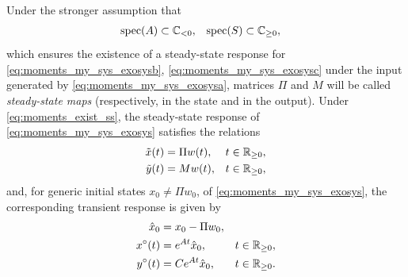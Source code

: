 Under the stronger assumption that
\begin{align}
  \label{eq:moments_exist_ss}
	\operatorname{spec}(A)&\subset\mathbb{C}_{<0}, & \operatorname{spec}(S)&\subset\mathbb{C}_{\geq0},
\end{align}
which ensures the existence of a steady-state response for
\eqref{eq:moments_my_sys_exosysb}, \eqref{eq:moments_my_sys_exosysc}
under the input generated by \eqref{eq:moments_my_sys_exosysa},
matrices $\Pi$ and $M$ will be called \emph{steady-state maps}
(respectively, in the state and in the output).
Under \eqref{eq:moments_exist_ss}, the steady-state response of
\eqref{eq:moments_my_sys_exosys} satisfies the relations
\begin{subequations}
  \label{eq:moments_moment_ss}
	\begin{align}
		\tilde{x}(t) &= \Pi w(t), & t\in\mathbb{R}_{\geq 0}, \label{eq:moments_moment_ssa} \\
		\tilde{y}(t) &= Mw(t), & t\in\mathbb{R}_{\geq 0}, \label{eq:moments_moment_ssb}
	\end{align}
\end{subequations}
and, for generic initial states $x_0 \neq \Pi w_0$, of \eqref{eq:moments_my_sys_exosys},
the corresponding transient response is given by
\begin{subequations}
  \label{eq:moments_moment_transient}
	\begin{align}
		\hat{x}_0 & = x_0-\Pi w_0, &\label{eq:moments_moment_transientc}\\
		x^{\circ}(t) &= e^{At} \hat{x}_0, & t\in\mathbb{R}_{\geq 0}, \label{eq:moments_moment_transienta}\\
		y^{\circ}(t) &= Ce^{At} \hat{x}_0, & t\in\mathbb{R}_{\geq 0}. \label{eq:moments_moment_transientb}
	\end{align}
\end{subequations}
